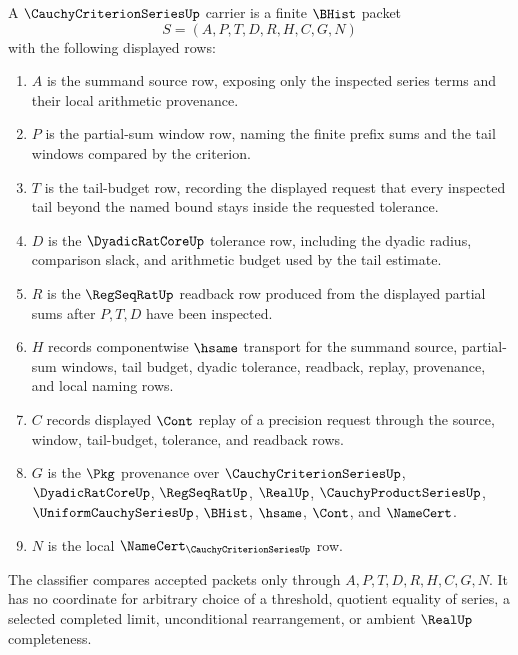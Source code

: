 \begin{definition}
\label{def:cauchy-criterion-series-carrier}
A $\CauchyCriterionSeriesUp$ carrier is a finite $\BHist$ packet
$$
S=(A,P,T,D,R,H,C,G,N)
$$
with the following displayed rows:
\begin{enumerate}
\item $A$ is the summand source row, exposing only the inspected series terms and their local arithmetic provenance.
\item $P$ is the partial-sum window row, naming the finite prefix sums and the tail windows compared by the criterion.
\item $T$ is the tail-budget row, recording the displayed request that every inspected tail beyond the named bound stays inside the requested tolerance.
\item $D$ is the $\DyadicRatCoreUp$ tolerance row, including the dyadic radius, comparison slack, and arithmetic budget used by the tail estimate.
\item $R$ is the $\RegSeqRatUp$ readback row produced from the displayed partial sums after $P,T,D$ have been inspected.
\item $H$ records componentwise $\hsame$ transport for the summand source, partial-sum windows, tail budget, dyadic tolerance, readback, replay, provenance, and local naming rows.
\item $C$ records displayed $\Cont$ replay of a precision request through the source, window, tail-budget, tolerance, and readback rows.
\item $G$ is the $\Pkg$ provenance over $\CauchyCriterionSeriesUp$, $\DyadicRatCoreUp$, $\RegSeqRatUp$, $\RealUp$, $\CauchyProductSeriesUp$, $\UniformCauchySeriesUp$, $\BHist$, $\hsame$, $\Cont$, and $\NameCert$.
\item $N$ is the local $\NameCert_{\CauchyCriterionSeriesUp}$ row.
\end{enumerate}
The classifier compares accepted packets only through $A,P,T,D,R,H,C,G,N$. It has no coordinate for arbitrary choice of a threshold, quotient equality of series, a selected completed limit, unconditional rearrangement, or ambient $\RealUp$ completeness.
\end{definition}

